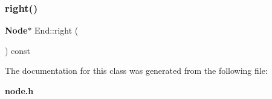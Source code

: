 \mbox{\label{class_end_a1e28f698b8995a75d14803b2db8466c1}} 
\subsubsection{right()}
{\footnotesize\ttfamily \textbf{ Node}$\ast$ End\+::\+right (\begin{DoxyParamCaption}{ }\end{DoxyParamCaption}) const\hspace{0.3cm}{\ttfamily [inline]}}



The documentation for this class was generated from the following file\+:\begin{DoxyCompactItemize}
\item 
\textbf{ node.\+h}\end{DoxyCompactItemize}

